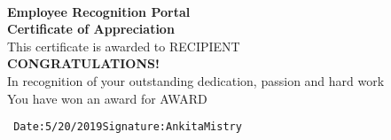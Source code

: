 \documentclass{article}
\begin{document}
    
    \begin{title} \\
        \begin{center}
            \textbf{{\normalsize \color{orange} Employee Recognition Portal}}\\
            \vspace{2em}
            \textbf{{\Large Certificate of Appreciation}}\\
            \vspace{2em}
            This certificate is awarded to RECIPIENT\\
            \vspace{2em}
            \textbf{{\normalsize \color{red} CONGRATULATIONS!}}\\
            \color{black}In recognition of your outstanding dedication, passion and hard work\\
            You have won an award for \color{blue} AWARD\\
        \end{center}
    \vspace{38em}
    
    \texttt{\noindent
    Date:5/20/2019\hspace{40ex}Signature:AnkitaMistry}
    \end{title}
\end{document}
